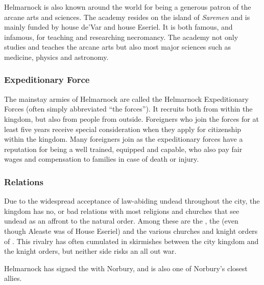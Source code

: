 Helmarnock is also known around the world for being a generous patron of the
arcane arts and sciences. The academy resides on the island of \emph{Saremen}
and is mainly funded by house de'Var and house Eseriel. It is both famous,
and infamous, for teaching and researching necromancy. The academy not only
studies and teaches the arcane arts but also most major sciences such as
medicine, physics and astronomy.

\subsubsection{Expeditionary Force}
\label{sec:Expeditionary Force}

The mainstay armies of Helmarnock are called the Helmarnock Expeditionary
Forces (often simply abbreviated ``the forces''). It recruits both from within
the kingdom, but also from people from outside. Foreigners who join the forces
for at least five years receive special consideration when they apply for
citizenship within the kingdom. Many foreigners join as the expeditionary
forces have a reputation for being a well trained, equipped and capable, who
also pay fair wages and compensation to families in case of death or injury.

\subsubsection{Relations}

Due to the widespread acceptance of law-abiding undead throughout the city,
the kingdom has no, or bad relations with most religions and churches that see
undead as an affront to the natural order. Among these are the
, the  (even
though Aleaste was of House Eseriel) and the various churches and knight
orders of . This rivalry has often cumulated in skirmishes
between the city kingdom and the knight orders, but neither side risks an all
out war.

Helmarnock has signed the  with Norbury, and is also
one of Norbury's closest allies.
